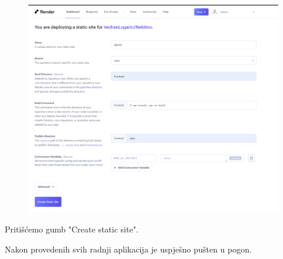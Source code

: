 				\begin{figure}[htb]
					\centering
					\includegraphics[width=15cm]{slike/front_3.png}
					\label{fig:fer-logo}
				\end{figure}
				
				\text{}Pritišćemo gumb "Create static site".
			
				\text{}Nakon provedenih svih radnji aplikacija je uspješno pušten u pogon.
			
			\eject 